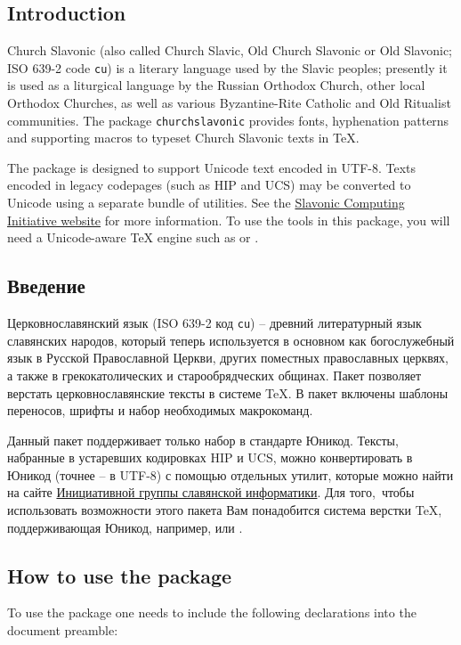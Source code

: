 \tableofcontents

\begin{EN}
\section*{Introduction}
Church Slavonic (also called Church Slavic, Old Church Slavonic
or Old Slavonic; ISO 639-2 code \texttt{cu}) is a literary language used by
the Slavic peoples; presently it is used as a liturgical language by the
Russian Orthodox Church, other local Orthodox Churches, as well
as various Byzantine-Rite Catholic and Old Ritualist communities.
The package \texttt{churchslavonic} provides fonts, hyphenation
patterns and supporting macros to typeset
Church Slavonic texts in \TeX{}.

The package is designed to support Unicode text encoded in UTF-8.
Texts encoded in legacy codepages (such as HIP and UCS) may be
converted to Unicode using a separate bundle of utilities.
See the \href{http://sci.ponomar.net/}
{Slavonic Computing Initiative website} for more information.
To use the tools in this package, you will need a Unicode-aware \TeX{}
engine such as \XeTeX{} or \LuaTeX{}.
\end{EN}

\begin{RU}
\section*{Введение}
Церковнославянский язык (ISO 639-2 код \texttt{cu}) --
древний литературный язык славянских народов,
который теперь используется в основном как богослужебный язык
в Русской Православной Церкви, других поместных православных
церквях, а также в грекокатолических и старообрядческих общинах.
Пакет  позволяет верстать церковнославянские тексты
в системе \TeX{}. В пакет включены шаблоны переносов,
шрифты и набор необходимых макрокоманд.

Данный пакет поддерживает только набор в стандарте Юникод.
Тексты, набранные в устаревших кодировках HIP и UCS,
можно конвертировать в Юникод (точнее -- в UTF-8) с помощью
отдельных утилит, которые можно найти на сайте
\href{http://sci.ponomar.net/}
{Инициативной группы славянской информатики}.
Для того, чтобы использовать возможности этого пакета Вам
понадобится система верстки \TeX{}, поддерживающая Юникод,
например, \XeTeX{} или \LuaTeX{}.
\end{RU}

\begin{EN}
\section{How to use the package}
To use the  package one needs to include the following
declarations into the document preamble:
\end{EN}

